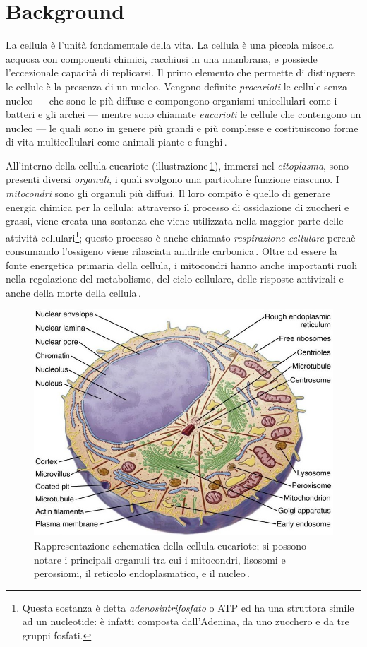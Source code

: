 \section{Background}

La cellula è l'unità fondamentale della vita. La cellula è una piccola miscela acquosa con componenti chimici, racchiusi in una mambrana, e possiede l'eccezionale capacità di replicarsi. Il primo elemento che permette di distinguere le cellule è la presenza di un nucleo. Vengono definite \textsl{procarioti} le cellule senza nucleo — che sono le più diffuse e compongono organismi unicellulari come i batteri e gli archei — mentre sono chiamate \textsl{eucarioti} le cellule che contengono un nucleo — le quali sono in genere più grandi e più complesse e costituiscono forme di vita multicellulari come animali piante e funghi\,\cite{alberts2015essential}.

All'interno della cellula eucariote (illustrazione\,\ref{fig:cell}), immersi nel \textsl{citoplasma}, sono presenti diversi \textsl{organuli}, i quali svolgono una particolare funzione ciascuno. I \textsl{mitocondri} sono gli organuli più diffusi. Il loro compito è quello di generare energia chimica per la cellula: attraverso il processo di ossidazione di zuccheri e grassi, viene creata una sostanza che viene utilizzata nella maggior parte delle attività cellulari\footnote{Questa sostanza è detta \textsl{adenosintrifosfato} o ATP ed ha una struttora simile ad un nucleotide: è infatti composta dall'Adenina, da uno zucchero e da tre gruppi fosfati.}; questo processo è anche chiamato \textsl{respirazione cellulare} perchè consumando l'ossigeno viene rilasciata anidride carbonica\,\cite{alberts2015essential, chinnery2003mitochondria}. Oltre ad essere la fonte energetica primaria della cellula, i mitocondri hanno anche importanti ruoli nella regolazione del metabolismo, del ciclo cellulare, delle risposte antivirali e anche della morte della cellula\,\cite{mcbride2006mitochondria}.

\begin{figure}[b!]
    \centering
    \includegraphics[width=.65\textwidth]{assets/cell.jpg}
    \caption[Rappresentazione schematica della cellula eucariote.]{Rappresentazione schematica della cellula eucariote; si possono notare i principali organuli tra cui i mitocondri, lisosomi e perossiomi, il reticolo endoplasmatico, e il nucleo\,\cite{pollard2022cell}.}\label{fig:cell}
\end{figure}

